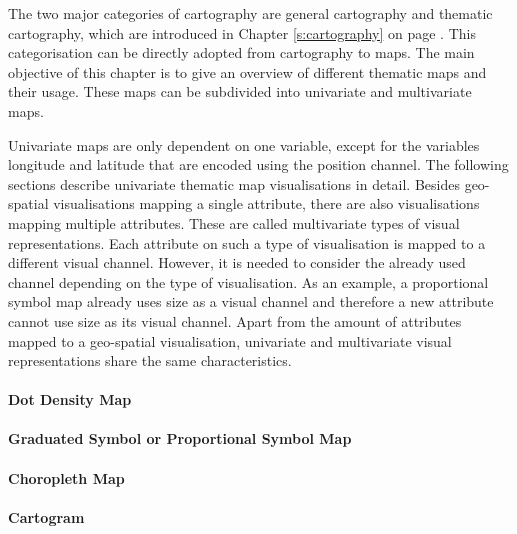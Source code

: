 The two major categories of cartography are general cartography and thematic cartography, which are introduced in Chapter \ref{s:cartography} on page \pageref{s:cartography}. This categorisation can be directly adopted from cartography to maps. The main objective of this chapter is to give an overview of different thematic maps and their usage. These maps can be subdivided into univariate and multivariate maps.

Univariate maps are only dependent on one variable, except for the variables longitude and latitude that are encoded using the position channel. The following sections describe univariate thematic map visualisations in detail. Besides geo-spatial visualisations mapping a single attribute, there are also visualisations mapping multiple attributes. These are called multivariate types of visual representations. Each attribute on such a type of visualisation is mapped to a different visual channel. However, it is needed to consider the already used channel depending on the type of visualisation. As an example, a proportional symbol map already uses size as a visual channel and therefore a new attribute cannot use size as its visual channel.
Apart from the amount of attributes mapped to a geo-spatial visualisation, univariate and multivariate visual representations share the same characteristics.

\paragraph{Dot Density Map}
\label{s:dot}


\paragraph{Graduated Symbol or Proportional Symbol Map}


\paragraph{Choropleth Map}

\label{s:choropleth}

\paragraph{Cartogram}

